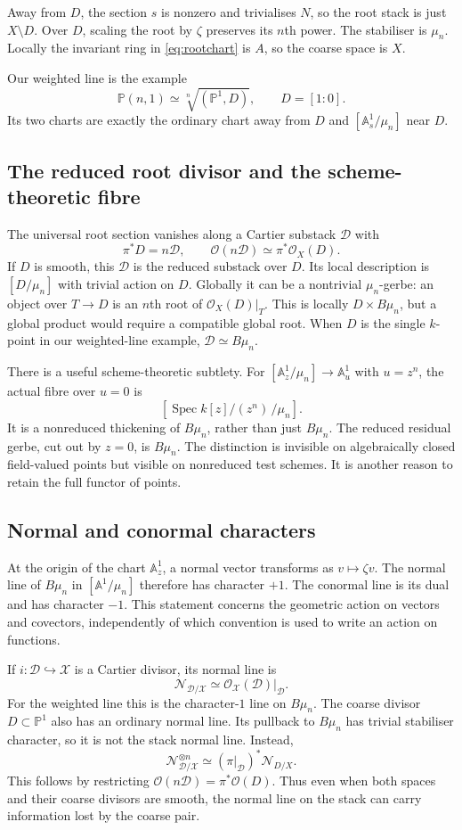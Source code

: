 \documentclass[11pt,a4paper]{article}
\numberwithin{equation}{section}
\theoremstyle{definition}
\newcommand{\A}{\mathbb A}
\newcommand{\PP}{\mathbb P}
\newcommand{\OO}{\mathcal O}
\newcommand{\cX}{\mathcal X}
\newcommand{\cD}{\mathcal D}
\newcommand{\Spec}{\operatorname{Spec}}
\newcommand{\normal}{\mathcal N}
\begin{document}
Away from $D$, the section $s$ is nonzero and trivialises $N$, so the root
stack is just $X\setminus D$. Over $D$, scaling the root by $\zeta$ preserves
its $n$th power. The stabiliser is $\mu_n$. Locally the invariant ring in
\eqref{eq:rootchart} is $A$, so the coarse space is $X$.

Our weighted line is the example
\[
 \PP(n,1)\simeq\sqrt[n]{(\PP^1,D)},\qquad D=[1:0].
\]
Its two charts are exactly the ordinary chart away from $D$ and
$[\A^1_s/\mu_n]$ near $D$.

\subsection{The reduced root divisor and the scheme-theoretic fibre}
The universal root section vanishes along a Cartier substack $\cD$ with
\[
 \pi^*D=n\cD,\qquad
 \OO(n\cD)\simeq\pi^*\OO_X(D).
\]
If $D$ is smooth, this $\cD$ is the reduced substack over $D$. Its local
description is $[D/\mu_n]$ with trivial action on $D$. Globally it can be
a nontrivial $\mu_n$-gerbe: an object over $T\to D$ is an $n$th root of
$\OO_X(D)|_T$. This is locally $D\times B\mu_n$, but a global product
would require a compatible global root. When $D$ is the single $k$-point
in our weighted-line example, $\cD\simeq B\mu_n$.

There is a useful scheme-theoretic subtlety. For $[\A^1_z/\mu_n]\to\A^1_u$
with $u=z^n$, the actual fibre over $u=0$ is
\[
 \left[\Spec k[z]/(z^n)\,/\mu_n\right].
\]
It is a nonreduced thickening of $B\mu_n$, rather than just $B\mu_n$.
The reduced residual gerbe, cut out by $z=0$, is $B\mu_n$.
The distinction is invisible on algebraically closed field-valued points
but visible on nonreduced test schemes. It is another reason to retain
the full functor of points.

\subsection{Normal and conormal characters}
At the origin of the chart $\A^1_z$, a normal vector transforms as
$v\mapsto\zeta v$. The normal line of $B\mu_n$ in $[\A^1/\mu_n]$
therefore has character $+1$. The conormal line is its dual and has
character $-1$. This statement concerns the geometric action on vectors
and covectors, independently of which convention is used to write an
action on functions.

If $i:\cD\hookrightarrow\cX$ is a Cartier divisor, its normal line is
\[
 \normal_{\cD/\cX}\simeq\OO_{\cX}(\cD)|_{\cD}.
\]
For the weighted line this is the character-$1$ line on $B\mu_n$.
The coarse divisor $D\subset\PP^1$ also has an ordinary normal line.
Its pullback to $B\mu_n$ has trivial stabiliser character, so it is not
the stack normal line. Instead,
\begin{equation}\label{eq:normalroot}
 \normal_{\cD/\cX}^{\otimes n}
 \simeq (\pi|_{\cD})^*\normal_{D/X}.
\end{equation}
This follows by restricting $\OO(n\cD)=\pi^*\OO(D)$.
Thus even when both spaces and their coarse divisors are smooth, the
normal line on the stack can carry information lost by the coarse pair.
\end{document}
